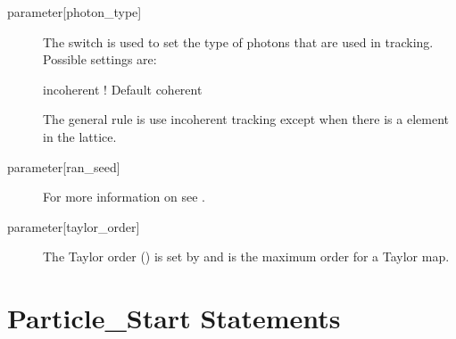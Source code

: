 \begin{description}
%
  \item[{parameter[photon_type]}] \Newline
The  switch is used to set the type of photons that are used in tracking. Possible
settings are:
\begin{example}
  incoherent    ! Default
  coherent 
\end{example}
The general rule is use incoherent tracking except when there is a  element in
the lattice.
%
  \item[{parameter[ran_seed]}] \Newline
For more information on  see .
%
  \item[{parameter[taylor_order]}] \Newline
The Taylor order () is set by  and is the maximum
order for a Taylor map.
  \end{description}

\section{Particle_Start Statements} 
\label{s:beam.start}

